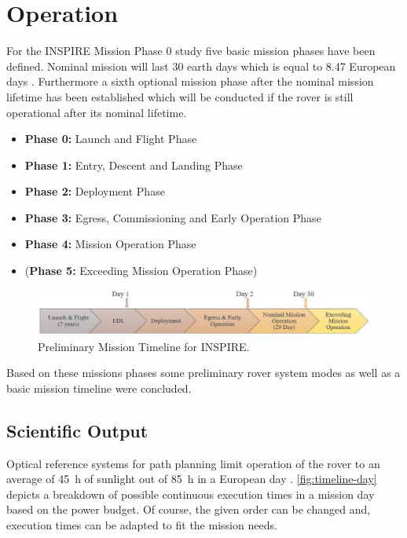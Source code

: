 \chapter{Operation}
\label{chap:Operation}

For the INSPIRE Mission Phase 0 study five basic mission phases have been defined. Nominal mission will last 30 earth days which is equal to 8.47 European days \cite{Europe}. Furthermore a sixth optional mission phase after the nominal mission lifetime has been established which will be conducted if the rover is still operational after its nominal lifetime.

\begin{itemize}
\itemsep0pt
\item	\textbf{Phase 0:} Launch and Flight Phase
\item	\textbf{Phase 1:} Entry, Descent and Landing Phase
\item	\textbf{Phase 2:} Deployment Phase
\item	\textbf{Phase 3:} Egress, Commissioning and Early Operation Phase
\item	\textbf{Phase 4:} Mission Operation Phase
\item	(\textbf{Phase 5:} Exceeding Mission Operation Phase) 
\end{itemize}

\begin{figure}[H]
{\centering
\includegraphics[width=1\textwidth]{Media/timeline}
\caption{Preliminary Mission Timeline for INSPIRE.}
\label{fig:timeline}
}
\end{figure}

Based on these missions phases some preliminary rover system modes as well as a basic mission timeline were concluded.

\section{Scientific Output}
\label{chap:sc-output}

Optical reference systems for path planning limit operation of the rover to an average of 45~h of sunlight out of 85~h in a European day \cite{Europa}. \autoref{fig:timeline-day} depicts a breakdown of possible continuous execution times in a mission day based on the power budget. Of course, the given order can be changed and, execution times can be adapted to fit the mission needs. \\

